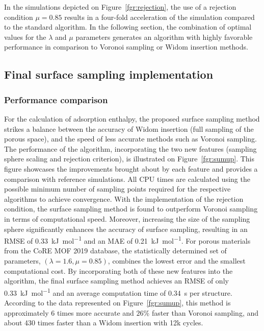 \documentclass[main]{subfiles}
\begin{document}
In the simulations depicted on Figure~\ref{fgr:rejection}, the use of a rejection condition $\mu = 0.85$ results in a four-fold acceleration of the simulation compared to the standard algorithm. In the following section, the combination of optimal values for the $\lambda$ and $\mu$ parameters generates an algorithm with highly favorable performance in comparison to Voronoi sampling or Widom insertion methods.

\subsection{Final surface sampling implementation}\label{sct:final_sampling}

\subsubsection{Performance comparison}

For the calculation of adsorption enthalpy, the proposed surface sampling method strikes a balance between the accuracy of Widom insertion (full sampling of the porous space), and the speed of less accurate methods such as Voronoi sampling. The performance of the algorithm, incorporating the two new features (sampling sphere scaling and rejection criterion), is illustrated on Figure~\ref{fgr:sumup}. This figure showcases the improvements brought about by each feature and provides a comparison with reference simulations. All CPU times are calculated using the possible minimum number of sampling points required for the respective algorithms to achieve convergence. With the implementation of the rejection condition, the surface sampling method is found to outperform Voronoi sampling in terms of computational speed. Moreover, increasing the size of the sampling sphere significantly enhances the accuracy of surface sampling, resulting in an RMSE of \SI{0.33}{\kilo\joule\per\mole} {and an MAE of \SI{0.21}{\kilo\joule\per\mole}}. For porous materials from the CoRE MOF 2019 database, the statistically determined set of parameters, $(\lambda = 1.6, \mu = 0.85)$, combines the lowest error and the smallest computational cost. By incorporating both of these new features into the algorithm, the final surface sampling method achieves an RMSE of only \SI{0.33}{\kilo\joule\per\mole} and an average computation time of \SI{0.34}{\second} per structure. According to the data represented on Figure~\ref{fgr:sumup}, this method is approximately 6 times more accurate and {$26$\%} faster than Voronoi sampling, and about 430 times faster than a Widom insertion with 12k cycles.
\end{document}

